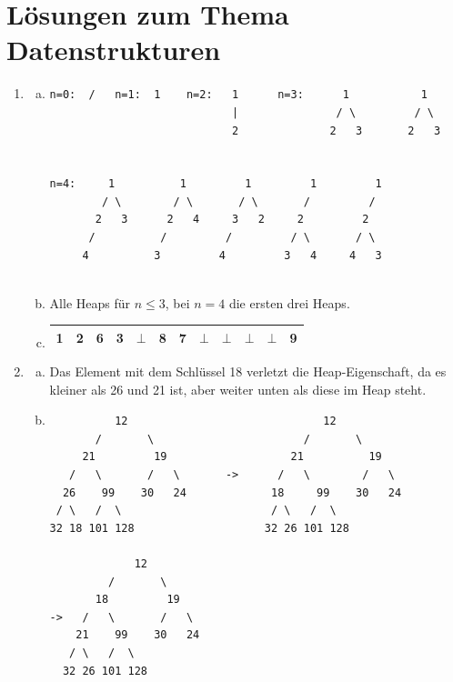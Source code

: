 \documentclass{scrartcl}
\begin{document}
\TabPositions{0.8cm, 1.6cm, 2.4cm, 3.2cm}

\section*{Lösungen zum Thema Datenstrukturen}
\begin{enumerate}[(1)]

\item \begin{enumerate}[(a)]
\item
\begin{verbatim}
n=0:  /   n=1:  1    n=2:   1      n=3:      1           1
                            |               / \         / \
                            2              2   3       2   3
                            

n=4:     1          1         1         1         1
        / \        / \       / \       /         /  
       2   3      2   4     3   2     2         2
      /          /         /         / \       / \
     4          3         4         3   4     4   3
     
\end{verbatim}
\item Alle Heaps f\"ur $n\leq 3$, bei $n=4$ die ersten drei Heaps.
\item \begin{tabular}{|c|c|c|c|c|c|c|c|c|c|c|c|}
\hline
1 & 2 & 6 & 3 & $\bot$ & 8 & 7 & $\bot$ & $\bot$ & $\bot$ & $\bot$ & 9 \\ \hline
\end{tabular}
\end{enumerate}
 \item \begin{enumerate}[(a)]
 	\item  Das Element mit dem Schlüssel 18 verletzt die Heap-Eigenschaft, da es kleiner als 26 und 21 ist, aber weiter unten als diese im Heap steht.
\item \begin{verbatim}
          12                              12 
       /       \                       /       \
     21         19                   21          19
   /   \       /   \       ->      /   \        /   \
  26    99    30   24             18     99    30   24
 / \   /  \                       / \   /  \
32 18 101 128                    32 26 101 128

             12 
         /       \
       18         19
->   /   \       /   \
    21    99    30   24
   / \   /  \
  32 26 101 128
\end{verbatim}
 \end{enumerate}


\end{enumerate}
\end{document}
